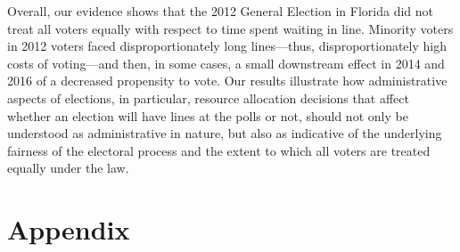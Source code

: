 \documentclass[12pt,titlepage]{article}
\begin{document}




Overall, our evidence shows that the 2012 General Election in Florida
did not treat all voters equally with respect to time spent waiting in
line.  Minority voters in 2012 voters faced disproportionately long
lines---thus, disproportionately high costs of voting---and then, in
some cases, a small downstream effect in 2014 and 2016 of a decreased
propensity to vote.  Our results illustrate how administrative aspects
of elections, in particular, resource allocation decisions that affect
whether an election will have lines at the polls or not, should not
only be understood as administrative in nature, but also as indicative
of the underlying fairness of the electoral process and the extent to
which all voters are treated equally under the law.




% 

\clearpage
\newpage




\newpage
\appendix
\section*{Appendix}


\end{document}
